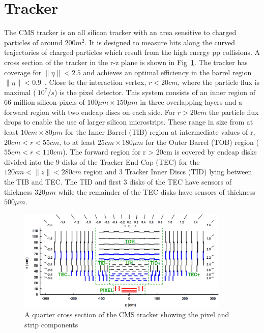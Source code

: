 \section{Tracker}
The CMS tracker is an all silicon tracker with an area sensitive to charged particles of around 200$m^2$. It is designed to measure hits along the
curved trajectories of charged particles which result from the high energy pp collisions. A cross section of the tracker in the r-z plane is shown in Fig~\ref{TRACKER_SLICE}.
The tracker has coverage for $\|\eta\| < 2.5$ and achieves an optimal efficiency in the barrel region $\|\eta\| < 0.9$~\cite{tracker_performance,tracker_tdr}. 
Close to the interaction vertex, $r < 20cm$, where the particle flux is maximal ($~10^7/s$) is the pixel detector. This system consists of an inner region of 66 million silicon 
pixels of $100\mu m \times 150\mu m$ in three overlapping layers and a forward region with two endcap discs on each side.
For $r > 20cm$ the particle flux drops to enable the use of larger silicon microstrips. These range in size from at least $10cm \times 80\mu m$ for the Inner Barrel (TIB) region 
at intermediate values of r, $20cm < r < 55cm$, to at least $25cm \times 180\mu m$ for the Outer Barrel (TOB) region ($55cm < r < 110cm$). The forward region
for r > 20cm is covered by endcap disks divided into the 9 disks of the Tracker End Cap (TEC) for the $120cm < \|z\| < 280 cm$ region and 
3 Tracker Inner Discs (TID) lying between the TIB and TEC. The TID and first 3 disks of the TEC have sensors of thickness $320\mu m$ while the remainder of the TEC disks
have sensors of thickness $500\mu m$\cite{tracker_tdr}.

\begin{figure}
\centering
    \includegraphics[width=0.9\textwidth]{./Figures/detector/CMS2Dtracker}
  \caption{A quarter cross section of the CMS tracker showing the pixel and strip components~\cite{tracker_fig}}
  \label{TRACKER_SLICE}
\end{figure}

